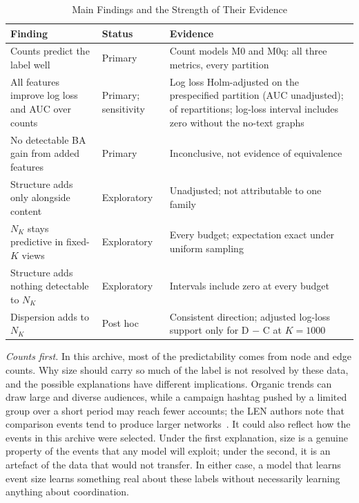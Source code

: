\documentclass[conference]{IEEEtran}
\newcommand{\NK}{N_K}
\begin{document}
\begin{table}[htbp]
\caption{Main Findings and the Strength of Their Evidence}
\begin{center}
\footnotesize
\setlength{\tabcolsep}{3pt}
\begin{tabular}{|>{\raggedright\arraybackslash}p{}|>{\raggedright\arraybackslash}p{}|>{\raggedright\arraybackslash}p{}|}
\hline
\textbf{Finding} & \textbf{Status} & \textbf{Evidence} \\
\hline
Counts predict the label well & Primary & Count models M0 and M0q: all three metrics, every partition \\ \hline
All features improve log loss and AUC over counts & Primary; sensitivity & Log loss Holm-adjusted on the prespecified partition (AUC unadjusted); \RTwCOneFav{} of \RNPartitions{} repartitions; log-loss interval includes zero without the no-text graphs \\ \hline
No detectable BA gain from added features & Primary & Inconclusive, not evidence of equivalence \\ \hline
Structure adds only alongside content & Exploratory & Unadjusted; not attributable to one family \\ \hline
$\NK$ stays predictive in fixed-$K$ views & Exploratory & Every budget; expectation exact under uniform sampling \\ \hline
Structure adds nothing detectable to $\NK$ & Exploratory & Intervals include zero at every budget \\ \hline
Dispersion adds to $\NK$ & Post hoc & Consistent direction; adjusted log-loss support only for D $-$ C at $K=1000$ \\ \hline
\end{tabular}
\label{tab:evidence}
\end{center}
\end{table}

\emph{Counts first.} In this archive, most of the predictability comes from node and edge counts. Why size should carry so much of the label is not resolved by these data, and the possible explanations have different implications. Organic trends can draw large and diverse audiences, while a campaign hashtag pushed by a limited group over a short period may reach fewer accounts; the LEN authors note that comparison events tend to produce larger networks~\cite{len}. It could also reflect how the events in this archive were selected. Under the first explanation, size is a genuine property of the events that any model will exploit; under the second, it is an artefact of the data that would not transfer. In either case, a model that learns event size learns something real about these labels without necessarily learning anything about coordination.
\end{document}
